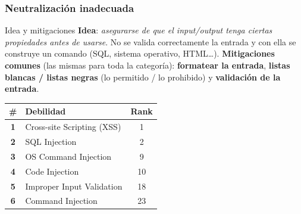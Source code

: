 \documentclass[11pt,a4paper]{article}
\begin{document}
\subsubsection{Neutralización inadecuada}
\begin{practbox}{Idea y mitigaciones}
\textbf{Idea}: \emph{asegurarse de que el input/output tenga ciertas propiedades antes de usarse}.
No se valida correctamente la entrada y con ella se construye un comando (SQL, sistema operativo,
HTML\dots). \textbf{Mitigaciones comunes} (las mismas para toda la categoría): \textbf{formatear
la entrada}, \textbf{listas blancas / listas negras} (lo permitido / lo prohibido) y
\textbf{validación de la entrada}.
\end{practbox}
\begin{center}
\renewcommand{\arraystretch}{1.25}
\begin{tabular}{>{\bfseries}c p{8.8cm} c}
\toprule
\# & Debilidad & Rank \\
\midrule
1 & Cross-site Scripting (XSS) & 1 \\
2 & SQL Injection & 2 \\
3 & OS Command Injection & 9 \\
4 & Code Injection & 10 \\
5 & Improper Input Validation & 18 \\
6 & Command Injection & 23 \\
\bottomrule
\end{tabular}
\end{center}
\end{document}
